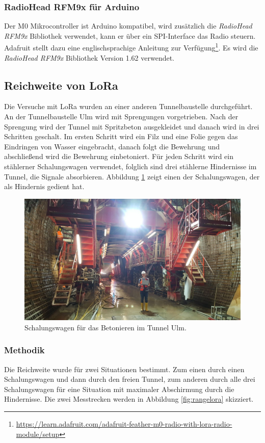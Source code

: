\subsubsection{RadioHead RFM9x für Arduino}
Der M0 Mikrocontroller ist Arduino kompatibel, wird zusätzlich die \emph{RadioHead RFM9x} Bibliothek verwendet, kann er über ein SPI-Interface das Radio steuern.
Adafruit stellt dazu eine englischsprachige Anleitung zur Verfügung\footnote{\url{https://learn.adafruit.com/adafruit-feather-m0-radio-with-lora-radio-module/setup}}.
Es wird die \emph{RadioHead RFM9x} Bibliothek Version 1.62 verwendet.

\subsection{Reichweite von LoRa}
Die Versuche mit LoRa wurden an einer anderen Tunnelbaustelle durchgeführt.
An der Tunnelbaustelle Ulm wird mit Sprengungen vorgetrieben.
Nach der Sprengung wird der Tunnel mit Spritzbeton ausgekleidet und danach wird in drei Schritten geschalt. 
Im ersten Schritt wird ein Filz und eine Folie gegen das Eindringen von Wasser eingebracht, danach folgt die Bewehrung und abschließend wird die Bewehrung einbetoniert.
Für jeden Schritt wird ein stählerner Schalungswagen verwendet, folglich sind drei stählerne Hindernisse im Tunnel, die Signale absorbieren.
Abbildung \ref{fig:schalungswagen} zeigt einen der Schalungswagen, der als Hindernis gedient hat.

\begin{figure}[h]
  \centering
	\includegraphics[width=\textwidth]{images/schalungswagen.jpg}
  \caption{Schalungswagen für das Betonieren im Tunnel Ulm.}
  \label{fig:schalungswagen}
\end{figure}

\subsubsection{Methodik} 
Die Reichweite wurde für zwei Situationen bestimmt.
Zum einen durch einen Schalungswagen und dann durch den freien Tunnel, zum anderen durch alle drei Schalungswagen für eine Situation mit maximaler Abschirmung durch die Hindernisse.
Die zwei Messtrecken werden in Abbildung \ref{fig:rangelora} skizziert.

